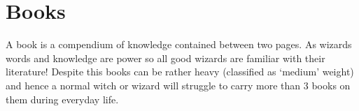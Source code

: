 \chapter{Books}\label{S:Books}

\newcommand\book[2]
{
	\vspace{2 ex}
	\small
	\vbox{
	{\bf #1}
	
	#2
	}
	\normalsize
}
\def\spellIntro{Spellbooks contain within them the information needed to cast spells. The rules for casting from spellbooks are detailed on page \pageref{S:Memory}.

For each topic\comma{} 5 books are listed in descending order. Each of these 5 books corresponds to one block of spells listed on page \pageref{S:SpellList}. {\it The Forbidden Arts}\comma{} the second Dark\minus{}Arts spellbook therefore contains all the level\minus{}2 Dark Arts spells\comma{} but not the level one spells. 
}
\def\normalIntro{Normal books fall into many different categories\comma{}. The list below contains an example of some of the most common topics of wizarding books\comma{} and a few examples of the most famous texts within those categories\comma{} where relevant. }

A book is a compendium of knowledge\comma{} contained between two pages. As wizards\comma{} words and knowledge are power \minus{}\minus{} so all good wizards are familiar with their literature! Despite this\comma{} books can be rather heavy (classified as `medium' weight)\comma{} and hence a normal witch or wizard will struggle to carry more than 3 books on them during everyday life. 
\vspace{-3 ex}
\def\w{8}
